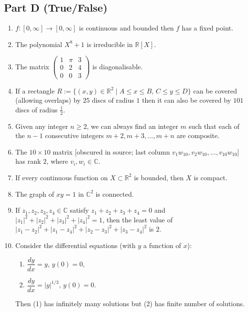 \documentclass[11pt, a4paper]{article}
\begin{document}
\subsection*{Part D (True/False)}
\begin{enumerate}[resume]
  \item $f: [0, \infty] \to [0, \infty]$ is continuous and bounded then $f$ has a fixed point.
  \item The polynomial $X^8 + 1$ is irreducible in $\mathbb{R}[X]$.
  \item The matrix $\begin{pmatrix} 1 & \pi & 3 \\ 0 & 2 & 4 \\ 0 & 0 & 3 \end{pmatrix}$ is diagonalisable.
  \item If a rectangle $R := \{(x, y) \in \mathbb{R}^2 \mid A \le x \le B, \, C \le y \le D\}$ can be covered (allowing overlaps) by $25$ discs of radius $1$ then it can also be covered by $101$ discs of radius $\frac{1}{2}$.
  \item Given any integer $n \ge 2$, we can always find an integer $m$ such that each of the $n - 1$ consecutive integers $m + 2, m + 3, \dots, m + n$ are composite.
  \item The $10 \times 10$ matrix {[obscured in source; last column $v_1 w_{10}, v_2 w_{10}, \dots, v_{10} w_{10}$]} has rank $2$, where $v_i, w_i \in \mathbb{C}$.
  \item If every continuous function on $X \subset \mathbb{R}^2$ is bounded, then $X$ is compact.
  \item The graph of $xy = 1$ in $\mathbb{C}^2$ is connected.
  \item If $z_1, z_2, z_3, z_4 \in \mathbb{C}$ satisfy $z_1 + z_2 + z_3 + z_4 = 0$ and $|z_1|^2 + |z_2|^2 + |z_3|^2 + |z_4|^2 = 1$, then the least value of $|z_1 - z_2|^2 + |z_1 - z_4|^2 + |z_2 - z_3|^2 + |z_3 - z_4|^2$ is $2$.
  \item Consider the differential equations (with $y$ a function of $x$):
  \begin{enumerate}[label=(\arabic*)]
    \item $\dfrac{dy}{dx} = y$, $y(0) = 0$,
    \item $\dfrac{dy}{dx} = |y|^{1/3}$, $y(0) = 0$.
  \end{enumerate}
  Then (1) has infinitely many solutions but (2) has finite number of solutions.
\end{enumerate}

\newpage
\end{document}
